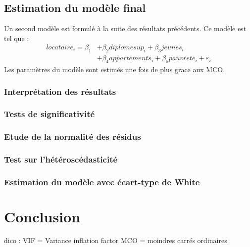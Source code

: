 \documentclass[]{article}
\begin{document}
\subsection{Estimation du modèle final}
Un second modèle est formulé à la suite des résultats précédents. Ce modèle est tel que :
\begin{equation*}
    \begin{split}
            locataire_i =  \beta_1 &+ \beta_2diplomesup_i + \beta_3jeunes_i\\ 
            &+ \beta_4appartements_i + \beta_5pauvrete_i + \varepsilon_i 
    \end{split}
\end{equation*}
Les paramètres du modèle sont estimés une fois de plus grace aux MCO.
\subsubsection{Interprétation des résultats}
\subsubsection{Tests de significativité}
\subsubsection{Etude de la normalité des résidus}
\subsubsection{Test sur l'hétéroscédasticité}
\subsubsection{Estimation du modèle avec écart-type de White}
\section{Conclusion}

dico : VIF = Variance inflation factor
MCO = moindres carrés ordinaires
\end{document}
